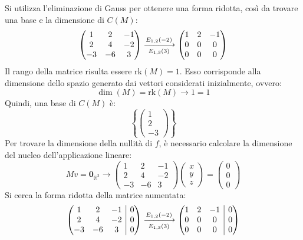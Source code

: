 \documentclass[a4paper]{article}
\makeatletter
\newenvironment{rowequmat}[1]{\left(\array{@{}#1@{}}}{\endarray\right)}
\makeatother
\begin{document}
	\noindent
	Si utilizza l'eliminazione di Gauss per ottenere una forma ridotta, così da trovare una base e la dimensione di $C\left(M\right)$:
	\begin{equation*}
		\begin{pmatrix}
			1	& 2		& -1 \\
			2	& 4		& -2 \\
			-3	& -6	& 3 
		\end{pmatrix}
		\xlongrightarrow[E_{1,3}\left(3\right)]{E_{1,2}\left(-2\right)}
		\begin{pmatrix}
			1	& 2	& -1 \\
			0	& 0	& 0 \\
			0	& 0	& 0 
		\end{pmatrix}
	\end{equation*}
	Il rango della matrice risulta essere $\mathrm{rk}\left(M\right) = 1$. Esso corrisponde alla dimensione dello spazio generato dai vettori considerati inizialmente, ovvero:
	\begin{equation*}
		\dim\left(M\right) = \mathrm{rk}\left(M\right) \longrightarrow 1 = 1
	\end{equation*}
	Quindi, una base di $C\left(M\right)$ è:
	\begin{equation*}
		\left\{
			\begin{pmatrix}
				1 \\ 2 \\ -3
			\end{pmatrix}
		\right\}
	\end{equation*}
	Per trovare la dimensione della nullità di $f$, è necessario calcolare la dimensione del nucleo dell'applicazione lineare:
	\begin{equation*}
		M v = \mathbf{0}_{\mathbb{R}^{3}} \longrightarrow
		\begin{pmatrix}
			1	& 2		& -1 \\
			2	& 4		& -2 \\
			-3	& -6	& 3
		\end{pmatrix}
		\begin{pmatrix}
			x \\ y \\ z
		\end{pmatrix} =
		\begin{pmatrix}
			0 \\ 0 \\ 0
		\end{pmatrix}
	\end{equation*}
	Si cerca la forma ridotta della matrice aumentata:
	\begin{equation*}
		\begin{rowequmat}{ccc|c}
			1	& 2		& -1 & 0 \\
			2	& 4		& -2 & 0 \\
			-3	& -6	& 3  & 0
		\end{rowequmat}
		\xlongrightarrow[E_{1,3}\left(3\right)]{E_{1,2}\left(-2\right)}
		\begin{rowequmat}{ccc|c}
			1	& 2	& -1 	& 0 \\
			0	& 0	& 0 	& 0 \\
			0	& 0	& 0  	& 0
		\end{rowequmat}
	\end{equation*}
\end{document}
